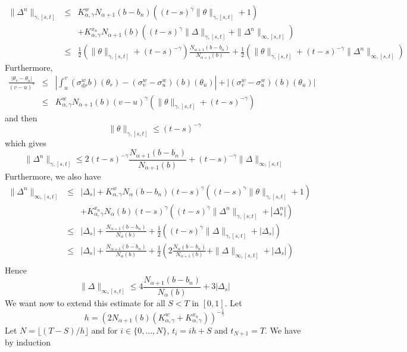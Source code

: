 \documentclass[11pt,a4paper,draft,reqno]{amsart}
\theoremstyle{definition}
\newcommand{\dd}{\mathrm{d}}
\begin{document}
\begin{eqnarray*}
\|\Delta^n\|_{\gamma,[s,t]}
&\le&
K^w_{\alpha,\gamma} N_{\alpha+1}(b-b_n)\left((t-s)^\gamma\|\theta\|_{\gamma, [s,t]}+1\right)\\
&&
 + K^{x_n}_{\alpha,\gamma}N_{\alpha+1}(b)\left((t-s)^\gamma\|\Delta\|_{\gamma,[s,t]}+\|\Delta^n\|_{\infty,[s,t]}\right)\\
 &\le&
 \frac12\left(\|\theta\|_{\gamma,[s,t]}+(t-s)^{-\gamma}\right)\frac{N_{\alpha+1}(b-b_n)}{N_{\alpha+1}(b)} +  \frac12\left(\|\theta\|_{\gamma,[s,t]}+(t-s)^{-\gamma}\|\Delta^n\|_{\infty, [s,t]}\right)
\end{eqnarray*}
Furthermore, 
\begin{eqnarray*}
\frac{\left|\theta_v-\theta_u\right|}{(v-u)^\gamma}
&\le&
\left|\int_u^v\left(\sigma^w_{\dd r}b\right)(\theta_r)- \left(\sigma^w_v-\sigma^w_u\right)(b)(\theta_u)\right|+\left|\left(\sigma^w_v-\sigma^w_u\right)(b)(\theta_u)\right|\\
&\le&
K^w_{\alpha,\gamma} N_{\alpha+1}(b)(v-u)^\gamma\left(\|\theta\|_{\gamma,[s,t]}+(t-s)^{-\gamma}\right)
\end{eqnarray*}
and then
$$\|\theta\|_{\gamma,[s,t]}\le(t-s)^{-\gamma}$$
which gives
\begin{equation}\label{eq:gronwall like 1}
\|\Delta^n\|_{\gamma,[s,t]}\le2(t-s)^{-\gamma}\frac{N_{\alpha+1}(b-b_n)}{N_{\alpha+1}(b)} + (t-s)^{-\gamma}\|\Delta\|_{\infty,[s,t]}
\end{equation}
Furthermore, we also have
\begin{eqnarray*}
\|\Delta^n\|_{\infty,[s,t]}
& \le &
|\Delta_s|
+K^w_{\alpha,\gamma}N_{\alpha}(b-b_n)(t-s)^{\gamma}\left((t-s)^{\gamma}\|\theta\|_{\gamma,[s,t]}+1\right)\\
&&
+ K^{x_n}_{\alpha,\gamma}N_{\alpha}(b)(t-s)^{\gamma}\left((t-s)^{\gamma}\|\Delta^n\|_{\gamma,[s,t]} + |\Delta^n_s|\right)\\
&\le&
|\Delta_s|+\frac{N_{\alpha+1}(b-b_n)}{N_{\alpha}(b)}+\frac12\left((t-s)^\gamma\|\Delta\|_{\gamma,[s,t]}+|\Delta_s|\right)\\
&\le&
|\Delta_s|+\frac{N_{\alpha+1}(b-b_n)}{N_{\alpha}(b)} + \frac12\left(2\frac{N_{\alpha}(b-b_n)}{N_{\alpha+1}(b)}+\|\Delta\|_{\infty,[s,t]}+|\Delta_s|\right)\\
\end{eqnarray*}
Hence
\begin{equation}\label{eq:gronwall like 2}
\|\Delta\|_{\infty,[s,t]}\le4\frac{N_{\alpha+1}(b-b_n)}{N_{\alpha}(b)} + 3 |\Delta_s|
\end{equation}
We want now to extend this estimate for all $S<T$ in $[0,1]$.
Let 
$$h=\left(2 N_{\alpha+1}(b)\left(K^w_{\alpha,\gamma}+K^{x_n}_{\alpha,\gamma}\right)\right)^{-\frac1\gamma}$$
Let $N = \lfloor (T-S)/h\rfloor$ and for $i\in\{0,\dots,N\}$, $t_i=ih+S$ and $t_{N+1}=T$.
We have by induction
\end{document}
